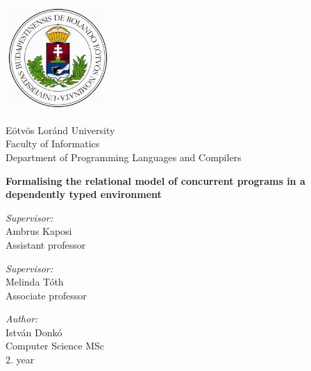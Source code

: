 \documentclass[runningheads,a4paper]{report}
\theoremstyle{definition}
\begin{document}


\begin{titlepage}
  \noindent
  \begin{minipage}{0.25 \textwidth}
    \includegraphics[height=40mm]{figures/cimer.png}
  \end{minipage}
  \hfill
  \begin{minipage}{0.67 \textwidth}
    \large
    Eötvös Loránd University \\
    Faculty of Informatics \\
    Department of Programming Languages and Compilers \\
    
  \end{minipage}

  \vfill

  \begin{center}
    {\LARGE \bfseries Formalising the relational model of concurrent programs in a dependently typed environment}
    \\[6cm]
    \begin{minipage}[t]{0.45 \textwidth}
      \emph{Supervisor:} \\[0.25 \baselineskip]
      {\large Ambrus Kaposi} \\[0.5 \baselineskip]
      Assistant professor
      \vspace{1cm}
      
      \emph{Supervisor:} \\[0.25 \baselineskip]
      {\large Melinda Tóth} \\[0.5 \baselineskip]
      Associate professor
    \end{minipage}
    \begin{minipage}[t]{0.45 \textwidth}
      \begin{flushright}
        \emph{Author:} \\[0.25 \baselineskip]
        {\large István Donkó} \\[0.5 \baselineskip]
        Computer Science MSc \\ %
        2. year
      \end{flushright}
    \end{minipage}
  \end{center}


\end{titlepage}
\end{document}
